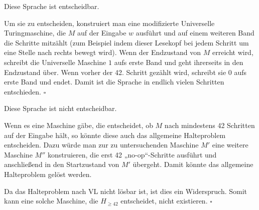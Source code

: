 Diese Sprache ist entscheidbar.

Um sie zu entscheiden, konstruiert man eine modifizierte Universelle
Turingmaschine, die $M$ auf der Eingabe $w$ ausführt und auf einem weiteren Band
die Schritte mitzählt (zum Beispiel indem dieser Lesekopf bei jedem Schritt um
eine Stelle nach rechts bewegt wird).
Wenn der Endzustand von $M$ erreicht wird, schreibt die Universelle Maschine $1$
aufs erste Band und geht ihrerseits in den Endzustand über. Wenn vorher der 42.
Schritt gezählt wird, schreibt sie $0$ aufs erste Band und endet. Damit ist die
Sprache in endlich vielen Schritten entschieden. \hfill$\square$

Diese Sprache ist nicht entscheidbar.

Wenn es eine Maschine gäbe, die entscheidet, ob $M$ nach mindestens 42 Schritten
auf der Eingabe hält, so könnte diese auch das allgemeine Halteproblem
entscheiden. Dazu würde man zur zu untersuchenden Maschine $M'$ eine weitere
Maschine $M''$ konstruieren, die erst 42 „no-op“-Schritte ausführt und
anschließend in den Startzustand von $M'$ übergeht. Damit könnte das allgemeine
Halteproblem gelöst werden.

Da das Halteproblem nach VL nicht lösbar ist, ist dies ein Widerspruch. Somit
kann eine solche Maschine, die $H_{\geq 42}$ entscheidet, nicht existieren.
\hfill$\square$
